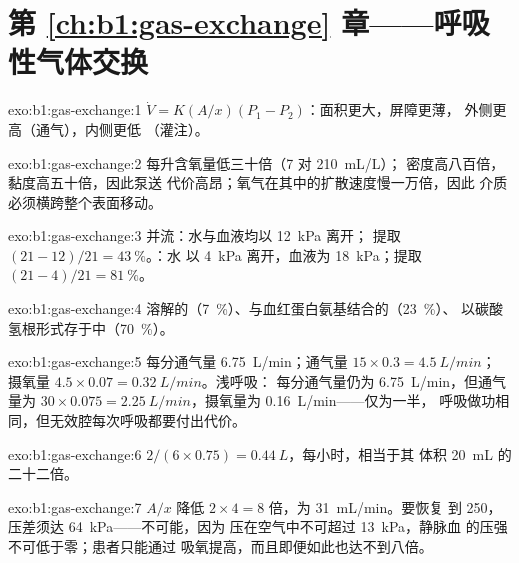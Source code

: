 \section*{第 \ref{ch:b1:gas-exchange} 章——呼吸性气体交换}

\begin{solution}{exo:b1:gas-exchange:1}
$\dot V = K(A/x)(P_1 - P_2)$：面积更大，屏障更薄，
外侧更高（通气），内侧更低
（灌注）。
\end{solution}

\begin{solution}{exo:b1:gas-exchange:2}
每升含氧量低三十倍（\qty{7}{} 对 \qty{210}{mL/L}）；
密度高八百倍，黏度高五十倍，因此泵送
代价高昂；氧气在其中的扩散速度慢一万倍，因此
介质必须横跨整个表面移动。
\end{solution}

\begin{solution}{exo:b1:gas-exchange:3}
并流：水与血液均以 \qty{12}{kPa} 离开；
提取 $(21 - 12)/21 = \qty{43}{\%}$。：水
以 \qty{4}{kPa} 离开，血液为 \qty{18}{kPa}；提取 $(21 - 4)/21 =
\qty{81}{\%}$。
\end{solution}

\begin{solution}{exo:b1:gas-exchange:4}
溶解的（\qty{7}{\%}）、与血红蛋白氨基结合的（\qty{23}{\%}）、
以碳酸氢根形式存于中（\qty{70}{\%}）。
\end{solution}

\begin{solution}{exo:b1:gas-exchange:5}
每分通气量 \qty{6.75}{L/min}；通气量 $15\times 0.3 = \qty{4.5}{L/min}$；
摄氧量 $4.5\times 0.07 = \qty{0.32}{L/min}$。浅呼吸：
每分通气量仍为 \qty{6.75}{L/min}，但通气量为 $30\times 0.075 =
\qty{2.25}{L/min}$，摄氧量为 \qty{0.16}{L/min}——仅为一半，
呼吸做功相同，但无效腔每次呼吸都要付出代价。
\end{solution}

\begin{solution}{exo:b1:gas-exchange:6}
$2/(6\times 0.75) = \qty{0.44}{L}$，每小时，相当于其
体积 \qty{20}{mL} 的二十二倍。
\end{solution}

\begin{solution}{exo:b1:gas-exchange:7}
$A/x$ 降低 $2\times 4 = 8$ 倍，为 \qty{31}{mL/min}。要恢复
到 \qty{250}{}，压差须达 \qty{64}{kPa}——不可能，因为
压在空气中不可超过 \qty{13}{kPa}，静脉血
的压强不可低于零；患者只能通过
吸氧提高，而且即便如此也达不到八倍。
\end{solution}

